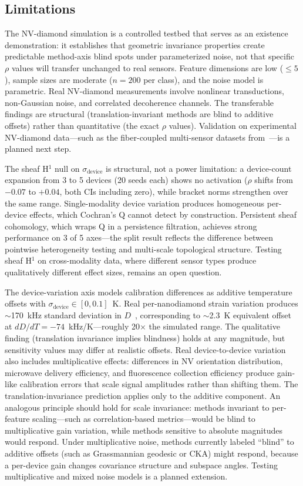 \documentclass[11pt]{article}
\begin{document}
\subsection{Limitations}

The NV-diamond simulation is a controlled testbed that serves as an
existence demonstration: it establishes that geometric invariance
properties create predictable method-axis blind spots under
parameterized noise, not that specific $\rho$ values will transfer
unchanged to real sensors.  Feature dimensions are low ($\leq 5$),
sample sizes are moderate ($n = 200$ per class), and the noise model
is parametric.  Real NV-diamond measurements involve nonlinear
transductions, non-Gaussian noise, and correlated decoherence channels.
The transferable findings are structural (translation-invariant methods
are blind to additive offsets) rather than quantitative (the exact
$\rho$ values).  Validation on experimental NV-diamond data---such as the fiber-coupled
multi-sensor datasets from~\citet{rajpal2025evaluating}---is a planned
next step.

The sheaf H$^1$ null on $\sigma_\text{device}$ is structural, not a
power limitation: a device-count expansion from 3 to 5 devices (20
seeds each) shows no activation ($\rho$ shifts from $-0.07$ to
$+0.04$, both CIs including zero), while bracket norms strengthen
over the same range.  Single-modality device variation produces
homogeneous per-device effects, which Cochran's Q cannot detect by
construction.  Persistent sheaf cohomology, which wraps Q in a
persistence filtration, achieves strong performance on 3 of 5
axes---the split result reflects the difference between pointwise
heterogeneity testing and multi-scale topological structure.  Testing
sheaf H$^1$ on cross-modality data, where different sensor types
produce qualitatively different effect sizes, remains an open
question.

The device-variation axis models calibration differences as additive
temperature offsets with $\sigma_\text{device} \in [0, 0.1]$~K.
Real per-nanodiamond strain variation produces $\sim$170~kHz standard
deviation in $D$~\citep{fujiwara2024fluorescent}, corresponding to
$\sim$2.3~K equivalent offset at $dD/dT = -74$~kHz/K---roughly 20$\times$
the simulated range.  The qualitative finding (translation invariance
implies blindness) holds at any magnitude, but sensitivity values may
differ at realistic offsets.  Real device-to-device variation also
includes multiplicative effects: differences in NV orientation
distribution, microwave delivery efficiency, and fluorescence collection
efficiency produce gain-like calibration errors that scale signal
amplitudes rather than shifting them.  The translation-invariance prediction applies only
to the additive component.  An analogous principle should hold for
scale invariance: methods invariant to per-feature scaling---such as
correlation-based metrics---would be blind to multiplicative gain
variation, while methods sensitive to absolute magnitudes would respond.
Under multiplicative noise, methods currently labeled ``blind'' to
additive offsets (such as Grassmannian geodesic or CKA) might respond,
because a per-device gain changes covariance structure and subspace
angles.  Testing multiplicative and mixed noise models is a planned
extension.
\end{document}
